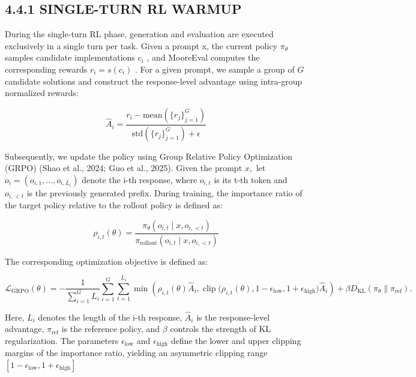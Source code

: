 \documentclass[
  10
]{article}
\begin{document}
\subsection{4.4.1 SINGLE-TURN RL WARMUP}\label{single-turn-rl-warmup}

During the single-turn RL phase, generation and evaluation are executed
exclusively in a single turn per task. Given a prompt x, the current
policy \(\pi _ { \theta }\) samples candidate implementations
\(c _ { i }\) , and MooreEval computes the corresponding rewards
\(r _ { i } = s ( c _ { i } )\) . For a given prompt, we sample a group
of \(G\) candidate solutions and construct the response-level advantage
using intra-group normalized rewards:

\[
\hat {A} _ {i} = \frac {r _ {i} - \mathrm{mean} (\{r _ {j} \} _ {j = 1} ^ {G})}{\mathrm{std} (\{r _ {j} \} _ {j = 1} ^ {G}) + \epsilon}\tag{3}
\]

Subsequently, we update the policy using Group Relative Policy
Optimization (GRPO) (Shao et al., 2024; Guo et al., 2025). Given the
prompt \(x ,\) let
\(o _ { i } = \left( o _ { i , 1 } , \ldots , o _ { i , L _ { i } } \right)\)
denote the i-th response, where \(o _ { i , t }\) is its t-th token and
\(o _ { i , < t }\) is the previously generated prefix. During training,
the importance ratio of the target policy relative to the rollout policy
is defined as:

\[
\rho_ {i, t} (\theta) = \frac {\pi_ {\theta} (o _ {i , t} \mid x , o _ {i , <   t})}{\pi_ {\mathrm{rollout}} (o _ {i , t} \mid x , o _ {i , <   t})}\tag{4}
\]

The corresponding optimization objective is defined as:

\[
\mathcal {L} _ {\mathrm{GRPO}} (\theta) = - \frac {1}{\sum_ {i = 1} ^ {G} L _ {i}} \sum_ {i = 1} ^ {G} \sum_ {t = 1} ^ {L _ {i}} \min \left(\rho_ {i, t} (\theta) \hat {A} _ {i}, \operatorname{clip} \bigl (\rho_ {i, t} (\theta), 1 - \epsilon_ {\text {low}}, 1 + \epsilon_ {\text {high}} \bigr) \hat {A} _ {i}\right) + \beta D _ {\mathrm{KL}} (\pi_ {\theta} \| \pi_ {\text {ref}}).\tag{5}
\]

Here, \(L _ { i }\) denotes the length of the i-th response,
\(\hat { A } _ { i }\) is the response-level advantage,
\(\pi _ { \mathrm { r e f } }\) is the reference policy, and \(\beta\)
controls the strength of KL regularization. The parameters
\(\epsilon _ { \mathrm { l o w } }\) and
\(\epsilon _ { \mathrm { h i g h } }\) define the lower and upper
clipping margins of the importance ratio, yielding an asymmetric
clipping range
\([ 1 - \epsilon _ { \mathrm { l o w } } , 1 + \epsilon _ { \mathrm { h i g h } } ]\)
\end{document}
